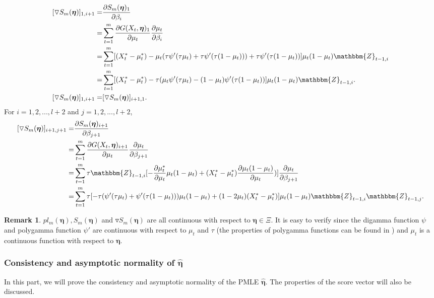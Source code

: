 \documentclass{article}
\theoremstyle{definition}
\newtheorem{remark}{Remark}
\begin{document}
\begin{equation*}
    \begin{aligned}
        [\triangledown S_m(\bm{\eta})]_{1,i+1} =& \frac{\partial S_m(\bm{\eta})_{1}}{\partial \beta_i} \\
        =& \sum_{t=1}^m \frac{\partial G(X_t,\bm{\eta})_{1}}{\partial \mu_t}\frac{\partial \mu_t}{\partial \beta_{i}} \\
        =& \sum_{t=1}^m [(X_t^*-\mu_t^*)-\mu_t(\tau \psi'(\tau \mu_t)+\tau \psi'(\tau (1-\mu_t)))+\tau \psi'(\tau (1-\mu_t))]\mu_t(1-\mu_t)\mathbbm{Z}_{t-1,i} \\
        =& \sum_{t=1}^m [(X_t^*-\mu_t^*)-\tau(\mu_t\psi'(\tau \mu_t)-(1-\mu_t)\psi'(\tau(1-\mu_t))]\mu_t(1-\mu_t) \mathbbm{Z}_{t-1,i}. \\
        [\triangledown S_m(\bm{\eta})]_{1,i+1}=&[\triangledown S_m(\bm{\eta})]_{i+1,1}.\end{aligned}
\end{equation*}
For $i = 1,2,...,l+2$ and $j = 1,2,...,l+2$,
\begin{equation*}
    \begin{aligned}
        [\triangledown S_m(\bm{\eta})]_{i+1,j+1} = & \frac{\partial S_m(\bm{\eta})_{i+1}}{\partial \beta_{j+1}} \\
        =& \sum_{t=1}^m \frac{\partial G(X_t,\bm{\eta})_{i+1}}{\partial \mu_t} \frac{\partial \mu_t}{\partial \beta_{j+1}} \\
        =& \sum_{t=1}^m \tau \mathbbm{Z}_{t-1,i}[-\frac{\partial \mu_t^*}{\partial \mu_t}\mu_t(1-\mu_t)+(X_t^*-\mu_t^*)\frac{\partial \mu_t(1-\mu_t)}{\partial \mu_t})]\frac{\partial \mu_t}{\partial \beta_{j+1}}\\
        =& \sum_{t=1}^m \tau [-\tau(\psi'(\tau \mu_t)+\psi'(\tau(1-\mu_t)))\mu_t(1-\mu_t)+(1-2\mu_t)(X_t^*-\mu_t^*)]\mu_t(1-\mu_t)\mathbbm{Z}_{t-1,i}\mathbbm{Z}_{t-1,j}.
        \end{aligned}
\end{equation*}
\begin{remark}
\label{remark: continuities of the closed-forms}
$pl_m(\bm{\eta}), S_m(\bm{\eta})$ and $\triangledown S_m(\bm{\eta})$ are all continuous with respect to $\bm{\eta} \in \Xi$. 
It is easy to verify since the digamma function $\psi$ and polygamma function $\psi'$ are continuous with respect to $\mu_t$ and $\tau$ (the properties of polygamma functions can be found in \cite{batir2007some}) and $\mu_t$ is a continuous function with respect to $\bm{\eta}$. 
\end{remark}
\subsubsection{Consistency and asymptotic normality of $\hat{\bm{\eta}}$}
In this part, we will prove the consistency and asymptotic normality of the PMLE $\hat{\bm{\eta}}$. The properties of the score vector will also be discussed. 
\end{document}
